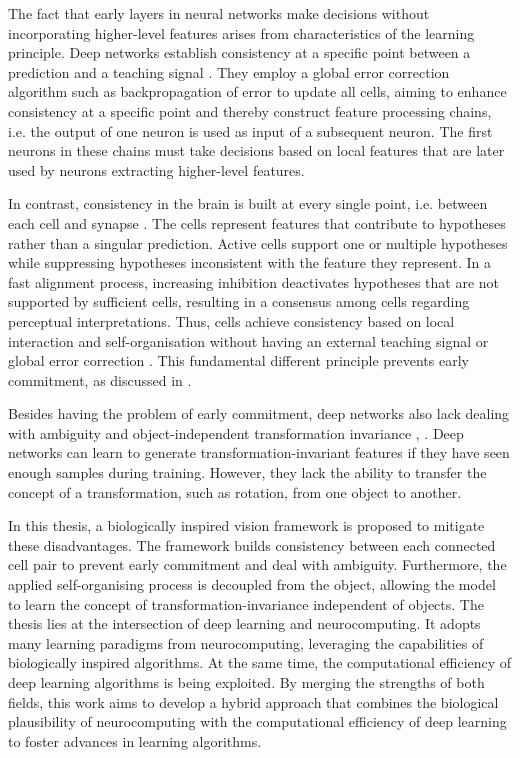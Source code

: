 The fact that early layers in neural networks make decisions without incorporating higher-level features arises from characteristics of the learning principle.
Deep networks establish consistency at a specific point between a prediction and a teaching signal .
They employ a global error correction algorithm such as backpropagation of error  to update all cells, aiming to enhance consistency at a specific point and thereby construct feature processing chains, i.e. the output of one neuron is used as input of a subsequent neuron.
The first neurons in these chains must take decisions based on local features that are later used by neurons extracting higher-level features.

In contrast, consistency in the brain is built at every single point, i.e. between each cell and synapse .
The cells represent features that contribute to hypotheses rather than a singular prediction.
Active cells support one or multiple hypotheses while suppressing hypotheses inconsistent with the feature they represent.
In a fast alignment process, increasing inhibition  deactivates hypotheses that are not supported by sufficient cells, resulting in a consensus among cells regarding perceptual interpretations.
Thus, cells achieve consistency based on local interaction and self-organisation  without having an external teaching signal or global error correction . This fundamental different principle prevents early commitment, as discussed in .

Besides having the problem of early commitment, deep networks also lack dealing with ambiguity and object-independent transformation invariance , \cite{madan_when_2022}.
Deep networks can learn to generate transformation-invariant features if they have seen enough samples during training.
However, they lack the ability to transfer the concept of a transformation, such as rotation, from one object to another.

In this thesis, a biologically inspired vision framework is proposed to mitigate these disadvantages. 
The framework builds consistency between each connected cell pair to prevent early commitment and deal with ambiguity.
Furthermore, the applied self-organising process is decoupled from the object, allowing the model to learn the concept of transformation-invariance independent of objects.
The thesis lies at the intersection of deep learning and neurocomputing. It adopts many learning paradigms from neurocomputing, leveraging the capabilities of biologically inspired algorithms. At the same time, the computational efficiency of deep learning algorithms is being exploited. By merging the strengths of both fields, this work aims to develop a hybrid approach that combines the biological plausibility of neurocomputing with the computational efficiency of deep learning to foster advances in learning algorithms.


